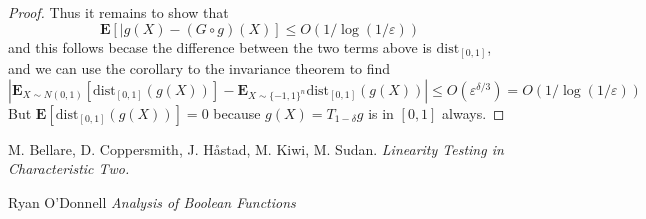 \begin{proof}
    Thus it remains to show that
    \[ \mathbf{E}[|g(X) - (G \circ g)(X)] \leq O(1/\log(1/\varepsilon)) \]
    and this follows becase the difference between the two terms above is $\text{dist}_{[0,1]}$, and we can use the corollary to the invariance theorem to find
    \[ \left| \mathbf{E}_{X \sim N(0,1)}[\text{dist}_{[0,1]}(g(X))] - \mathbf{E}_{X \sim \{ -1, 1 \}^n} \text{dist}_{[0,1]}(g(X)) \right| \leq O(\varepsilon^{\delta/3}) = O(1/\log(1/\varepsilon)) \]
    But $\mathbf{E}[\text{dist}_{[0,1]}(g(X))] = 0$ because $g(X) = T_{1-\delta}g$ is in $[0,1]$ always.
\end{proof}

\begin{thebibliography}{9}

M. Bellare, D. Coppersmith, J. H\r{a}stad, M. Kiwi, M. Sudan.
\textit{Linearity Testing in Characteristic Two.}

Ryan O'Donnell
\textit{Analysis of Boolean Functions}

\end{thebibliography}

